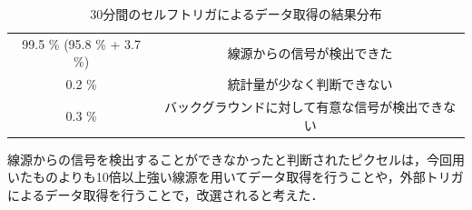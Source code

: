 \begin{table}[h]
  \centering
  \caption{30分間のセルフトリガによるデータ取得の結果分布}
  \label{tab:selfconc}
  \begin{tabular}{cc} \hline
    99.5 \% (95.8 \% + 3.7 \%)& 線源からの信号が検出できた \\
    0.2 \% & 統計量が少なく判断できない \\
    0.3 \% & バックグラウンドに対して有意な信号が検出できない \\ \hline
  \end{tabular}
\end{table}

線源からの信号を検出することができなかったと判断されたピクセルは，今回用いたものよりも10倍以上強い線源を用いてデータ取得を行うことや，外部トリガによるデータ取得を行うことで，改選されると考えた．
    


